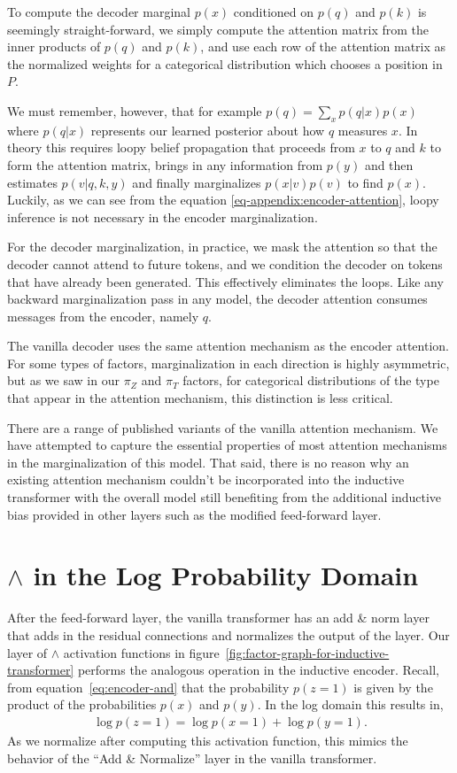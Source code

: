 \documentclass{article}
\begin{document}
To compute the decoder marginal $p(x)$ conditioned on $p(q)$ and $p(k)$ is seemingly straight-forward, we simply compute the attention matrix from the inner products of $p(q)$ and $p(k)$, and use each row of the attention matrix as the normalized weights for a categorical distribution which chooses a position in $P$.

We must remember, however, that for example $p(q) = \sum_x p(q|x)p(x)$ where $p(q|x)$ represents our learned posterior about how $q$ measures $x$.  In theory this requires loopy belief propagation that proceeds from $x$ to $q$ and $k$ to form the attention matrix, brings in any information from $p(y)$ and then estimates $p(v|q, k, y)$ and finally marginalizes $p(x|v)p(v)$ to find $p(x)$.  Luckily, as we can see from the equation \ref{eq-appendix:encoder-attention}, loopy inference is not necessary in the encoder marginalization.  

For the decoder marginalization, in practice, we mask the attention so that the decoder cannot attend to future tokens, and we condition the decoder on tokens that have already been generated. This effectively eliminates the loops.  Like any backward marginalization pass in any model, the decoder attention consumes messages from the encoder, namely $q$.

The vanilla decoder uses the same attention mechanism as the encoder attention. For some types of factors, marginalization in each direction is highly asymmetric, but as we saw in our $\pi_Z$ and $\pi_T$ factors, for categorical distributions of the type that appear in the attention mechanism, this distinction is less critical.

There are a range of published variants of the vanilla attention mechanism.  We have attempted to capture the essential properties of most attention mechanisms in the marginalization of this model.  That said, there is no reason why an existing attention mechanism couldn't be incorporated into the inductive transformer with the overall model still benefiting from the additional inductive bias provided in other layers such as the modified feed-forward layer.

\section{$\land$ in the Log Probability Domain}
\label{appendix:log-probability-and}

After the feed-forward layer, the vanilla transformer has an add \& norm layer that adds in the residual connections and normalizes the output of the layer. Our layer of $\land$ activation functions in figure~\ref{fig:factor-graph-for-inductive-transformer} performs the analogous operation in the inductive encoder. Recall, from equation~\ref{eq:encoder-and} that the probability $p(z=1)$ is given by the product of the probabilities $p(x)$ and $p(y)$. In the log domain this results in,
\begin{eqnarray}
    \log p(z=1) = \log p(x=1) + \log p(y=1).
\end{eqnarray}
As we normalize after computing this activation function, this mimics the behavior of the ``Add \& Normalize'' layer in the vanilla transformer.
\end{document}
